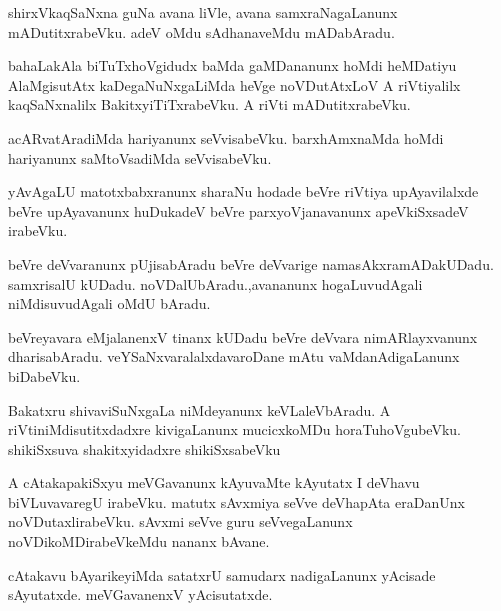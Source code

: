 \documentclass{article}
\begin{document}
\begin{mn}%
shirxVkaqSaNxna guNa avana liVle, avana samxraNagaLanunx mADutitxrabeVku. adeV oMdu 
sAdhanaveMdu mADabAradu.
\end{mn}

\begin{mn}%
bahaLakAla biTuTxhoVgidudx baMda gaMDananunx hoMdi heMDatiyu AlaMgisutAtx 
kaDegaNuNxgaLiMda heVge noVDutAtxLoV A riVtiyalilx kaqSaNxnalilx BakitxyiTiTxrabeVku. A 
riVti mADutitxrabeVku.
\end{mn}

\begin{mn}%
acARvatAradiMda hariyanunx seVvisabeVku. barxhAmxnaMda hoMdi hariyanunx saMtoVsadiMda 
seVvisabeVku.
\end{mn}

\begin{mn}%
yAvAgaLU matotxbabxranunx sharaNu hodade beVre riVtiya upAyavilalxde beVre upAyavanunx 
huDukadeV beVre parxyoVjanavanunx apeVkiSxsadeV irabeVku.
\end{mn}

\begin{mn}%
beVre deVvaranunx pUjisabAradu beVre deVvarige namasAkxramADakUDadu. samxrisalU kUDadu. 
noVDalUbAradu.,avananunx hogaLuvudAgali niMdisuvudAgali oMdU bAradu.
\end{mn}

\begin{mn}%
beVreyavara eMjalanenxV tinanx kUDadu beVre deVvara nimARlayxvanunx dharisabAradu. 
veYSaNxvaralalxdavaroDane mAtu vaMdanAdigaLanunx biDabeVku.
\end{mn}

\begin{mn}%
Bakatxru shivaviSuNxgaLa niMdeyanunx keVLaleVbAradu. A riVtiniMdisutitxdadxre kivigaLanunx 
mucicxkoMDu horaTuhoVgubeVku. shikiSxsuva shakitxyidadxre shikiSxsabeVku
\end{mn}

\begin{mn}%
A cAtakapakiSxyu meVGavanunx kAyuvaMte kAyutatx I deVhavu biVLuvavaregU irabeVku. matutx 
sAvxmiya seVve deVhapAta eraDanUnx noVDutaxlirabeVku. sAvxmi seVve guru seVvegaLanunx 
noVDikoMDirabeVkeMdu nananx bAvane.
\end{mn}

\begin{mn}%
cAtakavu bAyarikeyiMda satatxrU samudarx nadigaLanunx yAcisade sAyutatxde. meVGavanenxV 
yAcisutatxde.
\end{mn}
\end{document}

